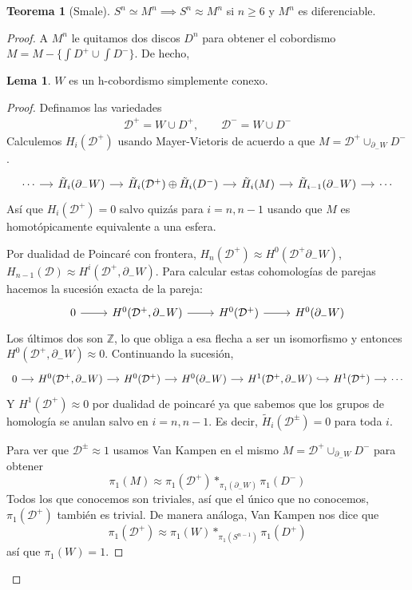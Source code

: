 \documentclass[spanish]{book}
\theoremstyle{definition}
\newtheorem*{lema}{Lema}
\newtheorem*{teo}{Teorema}
\newcommand{\Z}{\mathbb{Z}}
\begin{document}
\begin{teo}[Smale]
	$S^n\simeq M^n\implies S^n\approx M^n$ si $n\geq 6$ y $M^n$ es diferenciable.
\end{teo}
\begin{proof}
	A $M^n$ le quitamos dos discos $D^n$ para obtener el cobordismo $M=M-\{\int D^+\cup\int D^-\}$. De hecho,
	\begin{lema}
		$W$ es un h-cobordismo simplemente conexo.
	\end{lema}
	\begin{proof}
		Definamos las variedades
		\begin{align*}
			\mathcal{D}^+=W\cup D^+,\qquad\mathcal{D}^-=W\cup D^-
		\end{align*}
		Calculemos $H_i(\mathcal{D}^+)$ usando Mayer-Vietoris de acuerdo a que $M=\mathcal{D}^+\cup_{\partial_-W}D^-$.
		\[\begin{tikzcd}[column sep=small]
			 \cdots\arrow[r]&\tilde{H}_i(\partial_-W)\arrow[r]&\tilde{H}_i(\mathcal{D}^+)\oplus\tilde{H}_i(D^-)\arrow[r]&\tilde{H}_i(M)\arrow[r]&\tilde{H}_{i-1}(\partial_-W)\arrow[r]&\cdots
		\end{tikzcd}\]
		Así que $H_i(\mathcal{D}^+)=0$ salvo quizás para $i=n,n-1$ usando que $M$ es homotópicamente equivalente a una esfera.
		
		Por dualidad de Poincaré con frontera, $H_n(\mathcal{D}^+)\approx H^0(\mathcal{D}^+\partial_-W)$, $H_{n-1}(\mathcal{D})\approx H^i(\mathcal{D}^+,\partial_-W)$. Para calcular estas cohomologías de parejas hacemos la sucesión exacta de la pareja:
		\[\begin{tikzcd}
			0\arrow[r]&H^0(\mathcal{D}^+,\partial_-W)\arrow[r]&H^0(\mathcal{D}^+)\arrow[r]&H^0(\partial_-W)
		\end{tikzcd}\]
		Los últimos dos son $\Z$, lo que obliga a esa flecha a ser un isomorfismo y entonces $H^0(\mathcal{D}^+,\partial_-W)\approx0$. Continuando la sucesión,
		\[\begin{tikzcd}[column sep=small]
			0\arrow[r]&H^0(\mathcal{D}^+,\partial_-W)\arrow[r]&H^0(\mathcal{D}^+)\arrow[r]&H^0(\partial_-W)\arrow[r]&H^1(\mathcal{D}^+,\partial_-W)\arrow[r,hook]&H^1(\mathcal{D}^+)\arrow[r]&\cdots
		\end{tikzcd}\]
		Y $H^1(\mathcal{D}^+)\approx0$ por dualidad de poincaré ya que sabemos que los grupos de homología se anulan salvo en $i=n,n-1$. Es decir, $\tilde{H}_i(\mathcal{D}^\pm)=0$ para toda $i$.
		
		Para ver que $\mathcal{D}^\pm\approx1$ usamos Van Kampen en el mismo $M=\mathcal{D}^+\cup_{\partial_-W}D^-$ para obtener
		\[\pi_1(M)\approx\pi_1(\mathcal{D}^+)*_{\pi_1(\partial_-W)}\pi_1(D^-)\]
		Todos los que conocemos son triviales, así que el único que no conocemos, $\pi_1(\mathcal{D}^+)$ también es trivial. De manera análoga, Van Kampen nos dice que
		\[\pi_1(\mathcal{D}^+)\approx\pi_1(W)*_{\pi_1(S^{n-1})}\pi_1(D^+)\]
		así que $\pi_1(W)=1$.
		

\end{proof}
\end{proof}
\end{document}
